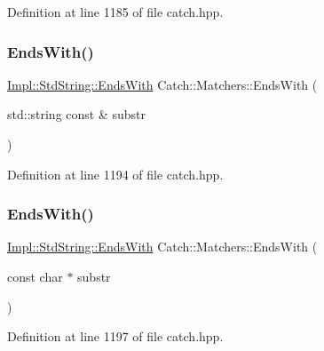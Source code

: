 Definition at line 1185 of file catch.\+hpp.

\hypertarget{namespace_catch_1_1_matchers_a1e32a2d23a1eb9eda9840c712c7b00c1}{}\label{namespace_catch_1_1_matchers_a1e32a2d23a1eb9eda9840c712c7b00c1} 
\subsubsection{\texorpdfstring{Ends\+With()}{EndsWith()}\hspace{0.1cm}{\footnotesize\ttfamily [1/2]}}
{\footnotesize\ttfamily \hyperlink{struct_catch_1_1_matchers_1_1_impl_1_1_std_string_1_1_ends_with}{Impl\+::\+Std\+String\+::\+Ends\+With} Catch\+::\+Matchers\+::\+Ends\+With (\begin{DoxyParamCaption}\item[{std\+::string const \&}]{substr }\end{DoxyParamCaption})\hspace{0.3cm}{\ttfamily [inline]}}



Definition at line 1194 of file catch.\+hpp.

\hypertarget{namespace_catch_1_1_matchers_ae3e6d8f7fea6fac6513596b23e5d5153}{}\label{namespace_catch_1_1_matchers_ae3e6d8f7fea6fac6513596b23e5d5153} 
\subsubsection{\texorpdfstring{Ends\+With()}{EndsWith()}\hspace{0.1cm}{\footnotesize\ttfamily [2/2]}}
{\footnotesize\ttfamily \hyperlink{struct_catch_1_1_matchers_1_1_impl_1_1_std_string_1_1_ends_with}{Impl\+::\+Std\+String\+::\+Ends\+With} Catch\+::\+Matchers\+::\+Ends\+With (\begin{DoxyParamCaption}\item[{const char $\ast$}]{substr }\end{DoxyParamCaption})\hspace{0.3cm}{\ttfamily [inline]}}



Definition at line 1197 of file catch.\+hpp.

\hypertarget{namespace_catch_1_1_matchers_a840317a3d0f828642c2f55155068bb97}{}\label{namespace_catch_1_1_matchers_a840317a3d0f828642c2f55155068bb97} 
